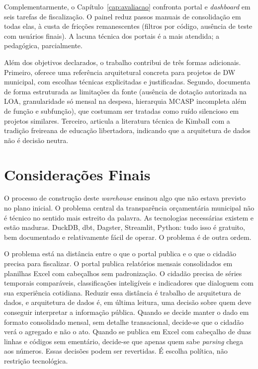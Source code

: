 Complementarmente, o Capítulo~\ref{cap:avaliacao} confronta portal e \textit{dashboard} em seis tarefas de fiscalização. O painel reduz passos manuais de consolidação em todas elas, à custa de fricções remanescentes (filtros por código, ausência de teste com usuários finais). A lacuna técnica dos portais é a mais atendida; a pedagógica, parcialmente.

Além dos objetivos declarados, o trabalho contribui de três formas adicionais. Primeiro, oferece uma referência arquitetural concreta para projetos de DW municipal, com escolhas técnicas explicitadas e justificadas. Segundo, documenta de forma estruturada as limitações da fonte (ausência de dotação autorizada na LOA, granularidade só mensal na despesa, hierarquia MCASP incompleta além de função e subfunção), que costumam ser tratadas como ruído silencioso em projetos similares. Terceiro, articula a literatura técnica de Kimball com a tradição freireana de educação libertadora, indicando que a arquitetura de dados não é decisão neutra.

\section{Considerações Finais}

O processo de construção deste \textit{warehouse} ensinou algo que não estava previsto no plano inicial. O problema central da transparência orçamentária municipal não é técnico no sentido mais estreito da palavra. As tecnologias necessárias existem e estão maduras. DuckDB, dbt, Dagster, Streamlit, Python: tudo isso é gratuito, bem documentado e relativamente fácil de operar. O problema é de outra ordem.

O problema está na distância entre o que o portal publica e o que o cidadão precisa para fiscalizar. O portal publica relatórios mensais consolidados em planilhas Excel com cabeçalhos sem padronização. O cidadão precisa de séries temporais comparáveis, classificações inteligíveis e indicadores que dialoguem com sua experiência cotidiana. Reduzir essa distância é trabalho de arquitetura de dados, e arquitetura de dados é, em última leitura, uma decisão sobre quem deve conseguir interpretar a informação pública. Quando se decide manter o dado em formato consolidado mensal, sem detalhe transacional, decide-se que o cidadão verá o agregado e não o ato. Quando se publica em Excel com cabeçalho de duas linhas e códigos sem ementário, decide-se que apenas quem sabe \textit{parsing} chega aos números. Essas decisões podem ser revertidas. É escolha política, não restrição tecnológica.

